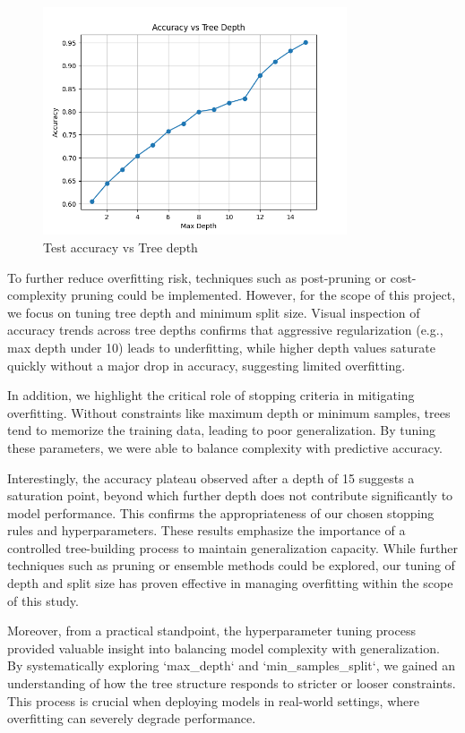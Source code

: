 \documentclass[11pt]{article}
\begin{document}
\begin{figure}[H]
    \centering
    \includegraphics[width=0.8\textwidth]{accuracy_by_depth.png}
    \caption{Test accuracy vs Tree depth}
\end{figure}

To further reduce overfitting risk, techniques such as post-pruning or cost-complexity pruning could be implemented. However, for the scope of this project, we focus on tuning tree depth and minimum split size. Visual inspection of accuracy trends across tree depths confirms that aggressive regularization (e.g., max depth under 10) leads to underfitting, while higher depth values saturate quickly without a major drop in accuracy, suggesting limited overfitting.

In addition, we highlight the critical role of stopping criteria in mitigating overfitting. Without constraints like maximum depth or minimum samples, trees tend to memorize the training data, leading to poor generalization. By tuning these parameters, we were able to balance complexity with predictive accuracy.

Interestingly, the accuracy plateau observed after a depth of 15 suggests a saturation point, beyond which further depth does not contribute significantly to model performance. This confirms the appropriateness of our chosen stopping rules and hyperparameters. These results emphasize the importance of a controlled tree-building process to maintain generalization capacity. While further techniques such as pruning or ensemble methods could be explored, our tuning of depth and split size has proven effective in managing overfitting within the scope of this study.

Moreover, from a practical standpoint, the hyperparameter tuning process provided valuable insight into balancing model complexity with generalization. By systematically exploring `max\_depth` and `min\_samples\_split`, we gained an understanding of how the tree structure responds to stricter or looser constraints. This process is crucial when deploying models in real-world settings, where overfitting can severely degrade performance.
\end{document}
